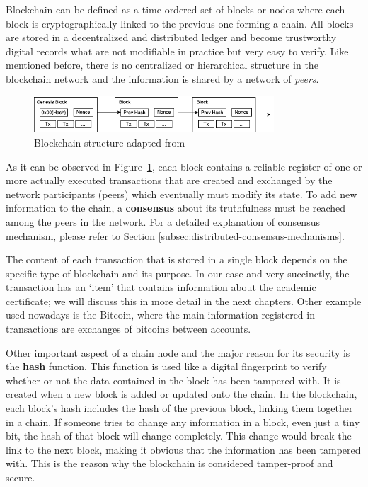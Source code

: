 Blockchain can be defined as a time-ordered set of blocks or nodes where each block is cryptographically linked to the previous one forming a chain. All blocks are stored in a decentralized and distributed ledger and become
trustworthy digital records what are not modifiable in practice but very easy to verify. Like mentioned before, there is no centralized or hierarchical structure in the blockchain network and the information is shared by a network of \textit{peers}.

\begin{figure}[h]\label{fig:blockchain}
    \begin{center}
        \includegraphics[width=0.8\textwidth]{assets/blockchain.png}
        \caption{Blockchain structure adapted from~\cite{nakamoto2008bitcoin}}
    \end{center}
\end{figure}

As it can be observed in Figure~\ref{fig:blockchain}, each block contains a reliable register of one or more actually executed transactions that are created and exchanged by the network participants (peers) which eventually must modify
its state. To add new information to the chain, a \textbf{consensus} about its truthfulness must be reached among the peers in the network.
For a detailed explanation of consensus mechanism, please refer to Section \ref{subsec:distributed-consensus-mechanisms}.

The content of each transaction that is stored in a single block depends on the specific type of blockchain and its purpose. In our case and very succinctly, the transaction has an `item' that contains information about the academic certificate; we will discuss this in more detail in the next chapters. Other example used nowadays is the Bitcoin, where the main information registered in transactions are exchanges of bitcoins between accounts.

Other important aspect of a chain node and the major reason for its security is the \textbf{hash} function.
This function is used like a digital fingerprint to verify whether or not the data contained in the block has been tampered with. It is created when a new block is added or updated onto the chain.
In the blockchain, each block's hash includes the hash of the previous block, linking them together in a chain. If someone tries to change any information in a block, even just a tiny bit, the hash of that block will change completely. This change would break the link to the next block, making it obvious that the information has been tampered with.
This is the reason why the blockchain is considered tamper-proof and secure.

